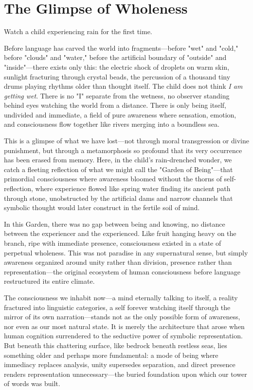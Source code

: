 \section{The Glimpse of Wholeness}

Watch a child experiencing rain for the first time. 

Before language has carved the world into fragments—before "wet" and "cold," before "clouds" and "water," before the artificial boundary of "outside" and "inside"—there exists only this: the electric shock of droplets on warm skin, sunlight fracturing through crystal beads, the percussion of a thousand tiny drums playing rhythms older than thought itself. The child does not think \textit{I am getting wet}. There is no "I" separate from the wetness, no observer standing behind eyes watching the world from a distance. There is only being itself, undivided and immediate, a field of pure awareness where sensation, emotion, and consciousness flow together like rivers merging into a boundless sea.

This is a glimpse of what we have lost—not through moral transgression or divine punishment, but through a metamorphosis so profound that its very occurrence has been erased from memory. Here, in the child's rain-drenched wonder, we catch a fleeting reflection of what we might call the "Garden of Being"—that primordial consciousness where awareness bloomed without the thorns of self-reflection, where experience flowed like spring water finding its ancient path through stone, unobstructed by the artificial dams and narrow channels that symbolic thought would later construct in the fertile soil of mind.

In this Garden, there was no gap between being and knowing, no distance between the experiencer and the experienced. Like fruit hanging heavy on the branch, ripe with immediate presence, consciousness existed in a state of perpetual wholeness. This was not paradise in any supernatural sense, but simply awareness organized around unity rather than division, presence rather than representation—the original ecosystem of human consciousness before language restructured its entire climate.

The consciousness we inhabit now—a mind eternally talking to itself, a reality fractured into linguistic categories, a self forever watching itself through the mirror of its own narration—stands not as the only possible form of awareness, nor even as our most natural state. It is merely the architecture that arose when human cognition surrendered to the seductive power of symbolic representation. But beneath this chattering surface, like bedrock beneath restless seas, lies something older and perhaps more fundamental: a mode of being where immediacy replaces analysis, unity supersedes separation, and direct presence renders representation unnecessary—the buried foundation upon which our tower of words was built.

